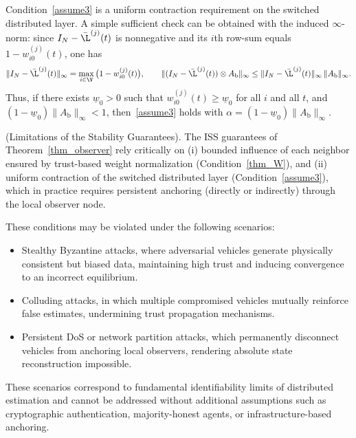\begin{remark}
Condition~\eqref{assume3} is a uniform contraction requirement on the switched distributed layer.
A simple sufficient check can be obtained with the induced $\infty$-norm: since $I_N-\bar{\L}^{(j)}(t)$ is nonnegative and its $i$th row-sum equals $1-w_{i0}^{(j)}(t)$, one has
\[
\|I_N-\bar{\L}^{(j)}(t)\|_\infty=\max_{i\in\V}\big(1-w_{i0}^{(j)}(t)\big),
\qquad
\|(I_N-\bar{\L}^{(j)}(t))\otimes A_{\text{b}}\|_\infty \le \|I_N-\bar{\L}^{(j)}(t)\|_\infty\,\|A_{\text{b}}\|_\infty.
\]
Thus, if there exists $\underline{w}_0>0$ such that $w_{i0}^{(j)}(t)\ge \underline{w}_0$ for all $i$ and all $t$, and $(1-\underline{w}_0)\|A_{\text{b}}\|_\infty<1$, then~\eqref{assume3} holds with $\alpha=(1-\underline{w}_0)\|A_{\text{b}}\|_\infty$.
\end{remark}
\vspace*{-0.3cm}

\begin{remark} (Limitations of the Stability Guarantees).
The ISS guarantees of Theorem~\ref{thm_observer} rely critically on (i) bounded influence of each neighbor ensured by trust-based weight normalization (Condition~\ref{thm_W}), and (ii) uniform contraction of the switched distributed layer (Condition~\eqref{assume3}), which in practice requires persistent anchoring (directly or indirectly) through the local observer node.

These conditions may be violated under the following scenarios:
\begin{itemize}
    \item Stealthy Byzantine attacks, where adversarial vehicles generate physically consistent but biased data, maintaining high trust and inducing convergence to an incorrect equilibrium.
    \item Colluding attacks, in which multiple compromised vehicles mutually reinforce false estimates, undermining trust propagation mechanisms.
    \item Persistent DoS or network partition attacks, which permanently disconnect vehicles from anchoring local observers, rendering absolute state reconstruction impossible.
\end{itemize}

These scenarios correspond to fundamental identifiability limits of distributed estimation and cannot be addressed without additional assumptions such as cryptographic authentication, majority-honest agents, or infrastructure-based anchoring.
\end{remark}

